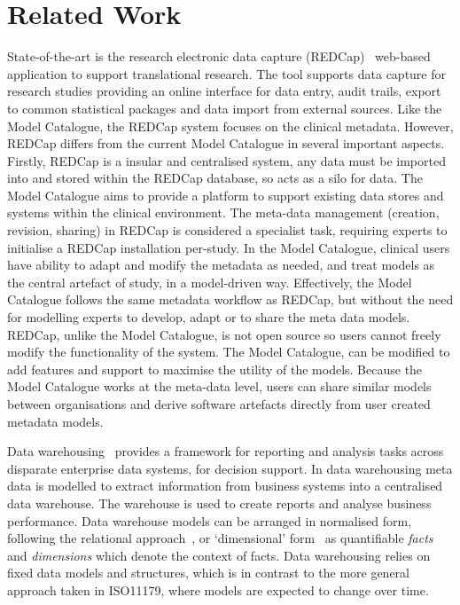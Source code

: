 
\section{Related Work}
State-of-the-art is the research electronic data capture (REDCap)~\cite{harr09} web-based application to support translational research. The tool supports data capture for research studies providing an online interface for data entry, audit trails, export to common statistical packages and data import from external sources. Like the Model Catalogue, the REDCap system focuses on the clinical metadata. However, REDCap differs from the current Model Catalogue in several important aspects. Firstly, REDCap is a insular and centralised system, any data must be imported into and stored within the REDCap database, so acts as a silo for data. The Model Catalogue aims to provide a platform to support existing data stores and systems within the clinical environment. The meta-data management (creation, revision, sharing) in REDCap is considered a specialist task, requiring experts to initialise a REDCap installation per-study. In the Model Catalogue, clinical users have ability to adapt and modify the metadata as needed, and treat models as the central artefact of study, in a model-driven way. Effectively, the Model Catalogue follows the same metadata workflow as REDCap, but without the need for modelling experts to develop, adapt or to share the meta data models. REDCap, unlike the Model Catalogue, is not open source so users cannot freely modify the functionality of the system. The Model Catalogue, can be modified to add features and support to maximise the utility of the models. Because the Model Catalogue works at the meta-data level, users can share similar models between organisations and derive software artefacts directly from user created metadata models.


Data warehousing~\cite{kim02} provides a framework for reporting and analysis tasks across disparate enterprise data systems, for decision support. In data warehousing meta data is modelled to extract information from business systems into a centralised data warehouse. The warehouse is used to create reports and analyse business performance. Data warehouse models can be arranged in normalised form, following the relational approach~\cite{inm92}, or `dimensional’ form~\cite{kim02} as quantifiable \emph{facts} and \emph{dimensions} which denote the context of facts. Data warehousing relies on fixed data models and structures, which is in contrast to the more general approach taken in ISO11179, where models are expected to change over time. 

